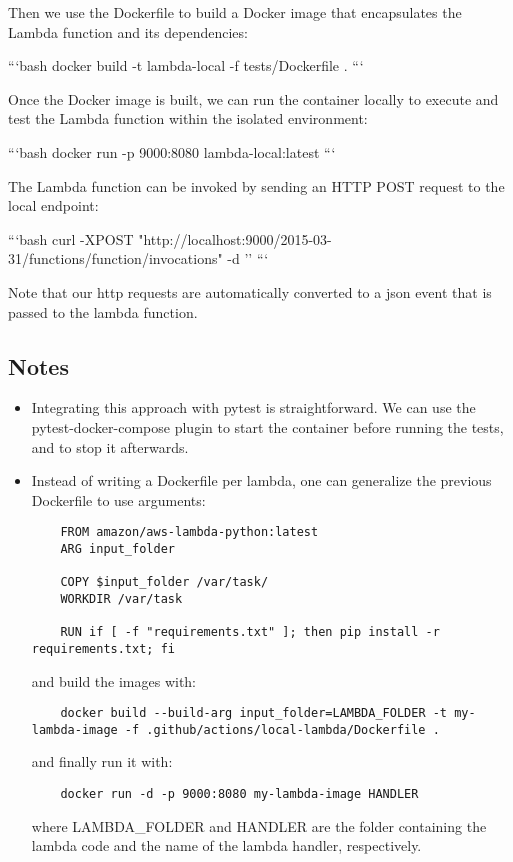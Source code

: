 \documentclass{article}
\begin{document}
Then we use the Dockerfile to build a Docker image that encapsulates the Lambda function and its dependencies:

```bash
docker build -t lambda-local -f tests/Dockerfile .
```

Once the Docker image is built, we can run the container locally to execute and test the Lambda function within the isolated environment:

```bash
docker run -p 9000:8080 lambda-local:latest
```

The Lambda function can be invoked by sending an HTTP POST request to the local endpoint:

```bash
curl -XPOST "http://localhost:9000/2015-03-31/functions/function/invocations" -d '{}'
```

Note that our http requests are automatically converted to a json event that is passed to the lambda function.

\subsection{Notes}
\begin{itemize}
\item Integrating this approach with pytest is straightforward. We can use the pytest-docker-compose plugin to start the container before running the tests, and to stop it afterwards.
\item Instead of writing a Dockerfile per lambda, one can generalize the previous Dockerfile to use arguments:

\begin{verbatim}
    FROM amazon/aws-lambda-python:latest
    ARG input_folder

    COPY $input_folder /var/task/
    WORKDIR /var/task

    RUN if [ -f "requirements.txt" ]; then pip install -r requirements.txt; fi

\end{verbatim}

and build the images with:

\begin{verbatim}
    docker build --build-arg input_folder=LAMBDA_FOLDER -t my-lambda-image -f .github/actions/local-lambda/Dockerfile .
\end{verbatim}

and finally run it with:
\begin{verbatim}
    docker run -d -p 9000:8080 my-lambda-image HANDLER
\end{verbatim}

where LAMBDA\_FOLDER and HANDLER are the folder containing the lambda code and the name of the lambda handler, respectively.

\end{itemize}
\end{document}

